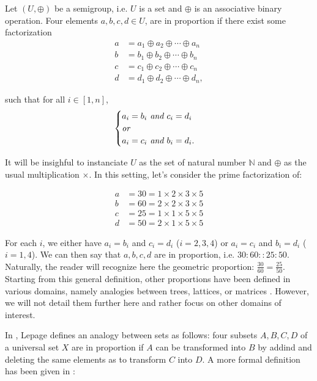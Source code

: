 \begin{definition}
\label{DEF:proportion_semi_group}
Let $(U, \oplus)$ be a semigroup, i.e. $U$ is a set and $\oplus$ is an
  associative binary operation. Four elements $a, b, c, d \in U$, are in proportion if
  there exist some factorization
  \begin{align*}
    a &= a_1 \oplus a_2 \oplus \cdots \oplus a_n\\
    b &= b_1 \oplus b_2 \oplus \cdots \oplus b_n\\
    c &= c_1 \oplus c_2 \oplus \cdots \oplus c_n\\
    d &= d_1 \oplus d_2 \oplus \cdots \oplus d_n,
  \end{align*}

  such that for all $i \in [1, n]$, 
  $$
  \begin{cases}
    a_i = b_i \emph{ and } c_i = d_i\\
    \emph{or}\\
    a_i = c_i \emph{ and } b_i = d_i.
  \end{cases}
  $$
\end{definition}

It will be insighful to instanciate $U$ as the set of natural number
$\mathbb{N}$ and $\oplus$ as the usual multiplication $\times$. In this
setting, let's consider the prime factorization of:

\begin{align*}
  a &= 30 = 1 \times 2 \times 3 \times 5\\
  b &= 60 = 2 \times 2 \times 3 \times 5\\
  c &= 25 = 1 \times 1 \times 5 \times 5\\
  d &= 50 = 2 \times 1 \times 5 \times 5
\end{align*}

For each $i$, we either have $a_i = b_i$ and $c_i = d_i$ ($i = 2, 3, 4$) or
$a_i = c_i$ and $b_i = d_i$ ($i = 1, 4$). We can then say that $a, b, c, d$ are
in proportion, i.e. $30: 60 :: 25:50$. Naturally, the reader will recognize
here the geometric proportion: $\frac{30}{60} = \frac{25}{50}$.
Starting from this general definition, other proportions have been defined in
various domains, namely analogies between trees, lattices, or matrices
\cite{MicDel04, StrYvoREPORT05, MicBayDelJAIR08}. However, we will not detail
them further here and rather focus on other domains of interest.

In \cite{Lep03}, Lepage defines an analogy between sets as follows: four subsets
$A, B, C, D$ of a universal set $X$ are in proportion if $A$ can be transformed
into $B$ by addind and deleting the same elements as to transform $C$ into $D$.
A more formal definition has been given in \cite{StrYvoREPORT05}:

